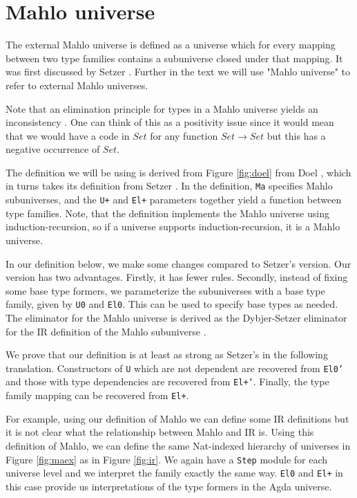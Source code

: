 

\section{Mahlo universe}

The external Mahlo universe is defined as a universe which for every mapping between two type families contains a subuniverse closed under that mapping. It was first discussed by Setzer \cite{setzer1996model}. Further in the text we will use "Mahlo universe" to refer to external Mahlo universes.

Note that an elimination principle for types in a Mahlo universe yields an inconsistency \cite{palmgren1998universes}. One can think of this as a positivity issue since it would mean that we would have a code in $Set$ for any function $Set \to Set$ but this has a negative occurrence of $Set$.

The definition we will be using is derived from Figure \ref{fig:doel} from Doel \cite{dandoelunivs}, which in turns takes its definition from Setzer \cite{setzer2005universes}. In the definition, \texttt{Ma} specifies Mahlo subuniverses, and the \texttt{U+} and \texttt{El+} parameters together yield a function between type families. Note, that the definition implements the Mahlo universe using induction-recursion, so if a universe supports induction-recursion, it is a Mahlo universe.



\newpage

In our definition below, we make some changes compared to Setzer's version. Our version has two advantages. Firstly, it has fewer rules. Secondly, instead of fixing some base type formers, we parameterize the subuniverses with a base type family, given by \texttt{U0} and \texttt{El0}. This can be used to specify base types as needed. The eliminator for the Mahlo universe is derived as the Dybjer-Setzer eliminator for the IR definition of the Mahlo subuniverse \cite{dybjer1999finite}.




We prove that our definition is at least as strong as Setzer's in the following translation. Constructors of \texttt{U} which are not dependent are recovered from \texttt{El0'} and those with type dependencies are recovered from \texttt{El+'}. Finally, the type family mapping can be recovered from \texttt{El+}.



For example, using our definition of Mahlo we can define some IR definitions but it is not clear what the relationship between Mahlo and IR is. Using this definition of Mahlo, we can define the same Nat-indexed hierarchy of universes in Figure \ref{fig:maex} as in Figure \ref{fig:ir}. We again have a \texttt{Step} module for each universe level and we interpret the family exactly the same way. \texttt{El0} and \texttt{El+} in this case provide us interpretations of the type formers in the Agda universe.



